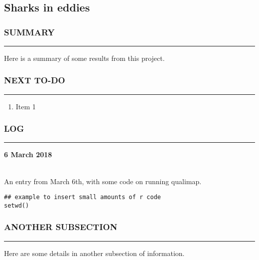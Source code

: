 \clearpage
\chapter{}
\section{Sharks in eddies}

\subsection*{SUMMARY}
\hrule
Here is a summary of some results from this project.


\subsection*{NEXT TO-DO}
\hrule

\begin{enumerate}
\item Item 1
\end{enumerate}


\subsection*{LOG}
\hrule
\hrulefill
\begin{large} \textbf{6 March 2018} \end{large} \\
An entry from March 6th, with some code on running qualimap.

\begin{verbatim}
## example to insert small amounts of r code
setwd()
\end{verbatim}


\subsection*{ANOTHER SUBSECTION}
\hrule
Here are some details in another subsection of information.


